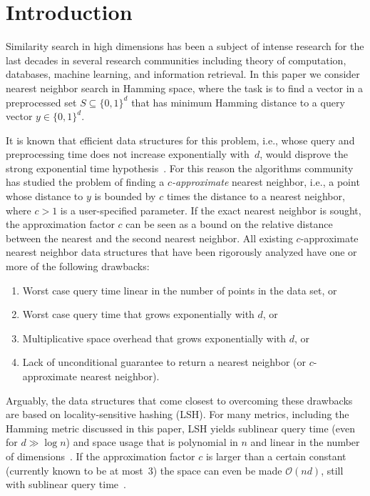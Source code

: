 \documentclass[prodmode,acmtalg]{acmsmall}
\newcommand{\Osymbol}{{\mathcal O}}
\newcommand{\BO}[1]{\Osymbol\left(#1\right)}
\begin{document}
\maketitle


\section{Introduction}

Similarity search in high dimensions has been a subject of intense research for the last decades in several research communities including theory of computation, databases, machine learning, and information retrieval.
In this paper we consider nearest neighbor search in Hamming space, where the task is to find a vector in a preprocessed set $S\subseteq \{0,1\}^d$ that has minimum Hamming distance to a query vector $y\in\{0,1\}^d$.

It is known that efficient data structures for this problem, i.e., whose query and preprocessing time does not increase exponentially with~$d$, would disprove the strong exponential time hypothesis~\cite{williams2005new,DBLP:conf/focs/AlmanW15}.
For this reason the algorithms community has studied the problem of finding a \emph{$c$-approximate} nearest neighbor, i.e., a point whose distance to $y$ is bounded by $c$ times the distance to a nearest neighbor, where $c > 1$ is a user-specified parameter.
If the exact nearest neighbor is sought, the approximation factor $c$ can be seen as a bound on the relative distance between the nearest and the second nearest neighbor.
All existing $c$-approximate nearest neighbor data structures that have been rigorously analyzed have one or more of the following drawbacks:
\begin{enumerate}
	\item Worst case query time linear in the number of points in the data set, or
	\item Worst case query time that grows exponentially with $d$, or
	\item Multiplicative space overhead that grows exponentially with $d$, or
	\item Lack of unconditional guarantee to return a nearest neighbor (or $c$-approximate nearest neighbor).
\end{enumerate}
Arguably, the data structures that come closest to overcoming these drawbacks are based on locality-sensitive hashing (LSH).
For many metrics, including the Hamming metric discussed in this paper, LSH yields sublinear query time (even for $d\gg \log n$) and space usage that is polynomial in $n$ and linear in the number of dimensions~\cite{Indyk1998,gionis1999similarity}.
If the approximation factor $c$ is larger than a certain constant (currently known to be at most~$3$) the space can even be made $\BO{nd}$, still with sublinear query time~\cite{panigrahy2006entropy,kapralov2015smooth,DBLP:journals/corr/Laarhoven15a}.
\end{document}
